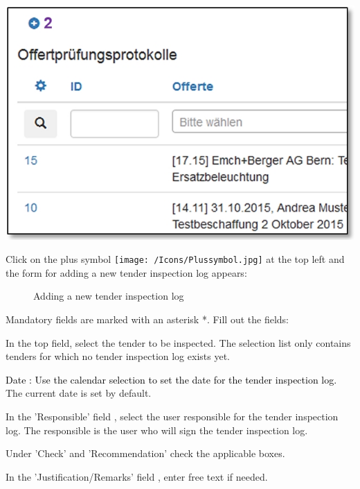 \begin{center}
\hspace{-15pt}   
\includegraphics[width=.75\linewidth]{../chapters/07_Beschaffungswesen/pictures/7-1-6_NeuesOffertPruefProtokoll.jpg}
\end{center}

Click on the plus symbol \texttt{[image: /Icons/Plussymbol.jpg]}  at the top left and the form for adding a new tender inspection log appears:

\begin{figure}[H]
\caption{Adding a new tender inspection log}
\end{figure}

Mandatory fields are marked with an asterisk *. Fill out the fields:

\vspace{\baselineskip}

\begin{compactitem}
\item
In the top field, select the tender to be inspected. The selection list  only contains tenders for which no tender inspection log exists yet.
\item
\textcolor{black}{Date } \textcolor{black}{: Use the calendar selection to set the date for the tender inspection log. }The current date is set by default.
\item
In the 'Responsible' field , select the user responsible for the tender inspection log. The responsible is the user who will sign the tender inspection log.
\item {\sffamily
Under 'Check'  and 'Recommendation'  check the applicable boxes.}
\item
In the 'Justification/Remarks' field , enter free text if needed.
\end{compactitem}

